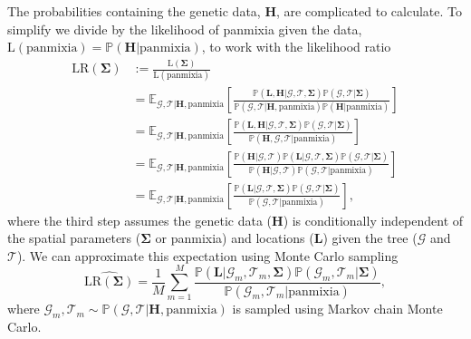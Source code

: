 \documentclass[12pt]{article}
\begin{document}
The probabilities containing the genetic data, $\mathbf{H}$, are complicated to calculate. 
To simplify we divide by the likelihood of panmixia given the data, $\mathrm{L}(\mathrm{panmixia}) = \mathbb{P}(\mathbf{H}|\mathrm{panmixia})$, to work with the likelihood ratio
%
\begin{equation}
\begin{aligned}
\mathrm{LR}(\mathbf{\Sigma}) &:= \frac{\mathrm{L}(\mathbf{\Sigma})}{\mathrm{L}(\mathrm{panmixia})}\\
&= \mathbb{E}_{\mathcal{G}, \mathcal{T} | \mathbf{H}, \mathrm{panmixia}} \left[ \frac{\mathbb{P}(\mathbf{L}, \mathbf{H} | \mathcal{G}, \mathcal{T},\mathbf{\Sigma}) \mathbb{P}(\mathcal{G}, \mathcal{T} | \mathbf{\Sigma})}{\mathbb{P}(\mathcal{G}, \mathcal{T} | \mathbf{H}, \mathrm{panmixia}) \mathbb{P}(\mathbf{H} | \mathrm{panmixia})} \right] \\
&= \mathbb{E}_{\mathcal{G}, \mathcal{T} | \mathbf{H}, \mathrm{panmixia}} \left[ \frac{\mathbb{P}(\mathbf{L},\mathbf{H} | \mathcal{G}, \mathcal{T},\mathbf{\Sigma}) \mathbb{P}(\mathcal{G}, \mathcal{T} | \mathbf{\Sigma})}{\mathbb{P}(\mathbf{H}, \mathcal{G}, \mathcal{T} | \mathrm{panmixia})} \right] \\
&= \mathbb{E}_{\mathcal{G}, \mathcal{T} | \mathbf{H}, \mathrm{panmixia}} \left[ \frac{\mathbb{P}(\mathbf{H} | \mathcal{G}, \mathcal{T}) \mathbb{P}(\mathbf{L} | \mathcal{G}, \mathcal{T},\mathbf{\Sigma}) \mathbb{P}(\mathcal{G}, \mathcal{T} | \mathbf{\Sigma})}{\mathbb{P}(\mathbf{H} | \mathcal{G},\mathcal{T})\mathbb{P}(\mathcal{G}, \mathcal{T} | \mathrm{panmixia})} \right] \\
&= \mathbb{E}_{\mathcal{G}, \mathcal{T} | \mathbf{H}, \mathrm{panmixia}} \left[ \frac{ \mathbb{P}(\mathbf{L} | \mathcal{G}, \mathcal{T}, \mathbf{\Sigma}) \mathbb{P}(\mathcal{G}, \mathcal{T} | \mathbf{\Sigma})}{\mathbb{P}(\mathcal{G}, \mathcal{T} | \mathrm{panmixia})} \right],
\end{aligned}
\end{equation}
%
where the third step assumes the genetic data ($\mathbf{H}$) is conditionally independent of the spatial parameters ($\mathbf{\Sigma}$ or panmixia) and locations ($\mathbf{L}$) given the tree ($\mathcal{G}$ and $\mathcal{T}$).
We can approximate this expectation using Monte Carlo sampling
%
\begin{equation}\label{eq:LRmontecarlo1}
\widehat{\mathrm{LR}(\mathbf{\Sigma})} = \frac{1}{M} \sum_{m=1}^{M} \frac{ \mathbb{P}(\mathbf{L} | \mathcal{G}_m, \mathcal{T}_m, \mathbf{\Sigma}) \mathbb{P}(\mathcal{G}_m, \mathcal{T}_m | \mathbf{\Sigma})}{\mathbb{P}(\mathcal{G}_m, \mathcal{T}_m | \mathrm{panmixia})},
\end{equation}
%
where $\mathcal{G}_m, \mathcal{T}_m \sim \mathbb{P}(\mathcal{G}, \mathcal{T} | \mathbf{H}, \mathrm{panmixia})$ is sampled using Markov chain Monte Carlo.
\end{document}

